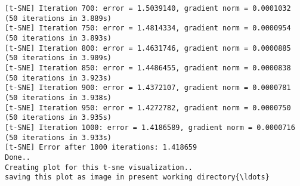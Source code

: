 \documentclass[11pt]{article}
\begin{document}
\begin{Verbatim}[commandchars=\\\{\}]
[t-SNE] Iteration 700: error = 1.5039140, gradient norm = 0.0001032 (50 iterations in 3.889s)
[t-SNE] Iteration 750: error = 1.4814334, gradient norm = 0.0000954 (50 iterations in 3.893s)
[t-SNE] Iteration 800: error = 1.4631746, gradient norm = 0.0000885 (50 iterations in 3.909s)
[t-SNE] Iteration 850: error = 1.4486455, gradient norm = 0.0000838 (50 iterations in 3.923s)
[t-SNE] Iteration 900: error = 1.4372107, gradient norm = 0.0000781 (50 iterations in 3.938s)
[t-SNE] Iteration 950: error = 1.4272782, gradient norm = 0.0000750 (50 iterations in 3.935s)
[t-SNE] Iteration 1000: error = 1.4186589, gradient norm = 0.0000716 (50 iterations in 3.933s)
[t-SNE] Error after 1000 iterations: 1.418659
Done..
Creating plot for this t-sne visualization..
saving this plot as image in present working directory{\ldots}

    \end{Verbatim}

    \begin{center}
    \end{center}
    { \hspace*{\fill} \\}
    
\end{document}
